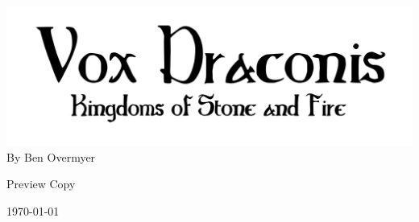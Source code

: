 \documentclass[letterpaper,table]{voxdraconis}
\begin{document}
\frontmatter
\thispagestyle{empty}

\begin{center}
\includegraphics[center]{logo-vox-draconis-2}
By Ben Overmyer

Preview Copy

\today
\end{center}

\setcounter{tocdepth}{3}
\tableofcontents
\newpage

\mainmatter












\printindex
\end{document}
